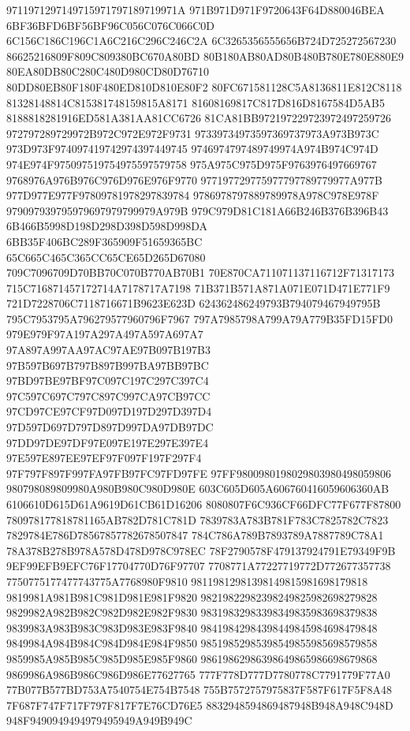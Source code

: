 9711971297149715971797189719971A
971B971D971F9720643F64D880046BEA
6BF36BFD6BF56BF96C056C076C066C0D
6C156C186C196C1A6C216C296C246C2A
6C3265356555656B724D725272567230
86625216809F809C809380BC670A80BD
80B180AB80AD80B480B780E780E880E9
80EA80DB80C280C480D980CD80D76710
80DD80EB80F180F480ED810D810E80F2
80FC671581128C5A8136811E812C8118
81328148814C815381748159815A8171
81608169817C817D816D8167584D5AB5
8188818281916ED581A381AA81CC6726
81CA81BB972197229723972497259726
972797289729972B972C972E972F9731
97339734973597369737973A973B973C
973D973F974097419742974397449745
9746974797489749974A974B974C974D
974E974F975097519754975597579758
975A975C975D975F9763976497669767
9768976A976B976C976D976E976F9770
977197729775977797789779977A977B
977D977E977F97809781978297839784
9786978797889789978A978C978E978F
979097939795979697979799979A979B
979C979D81C181A66B246B376B396B43
6B466B5998D198D298D398D598D998DA
6BB35F406BC289F365909F51659365BC
65C665C465C365CC65CE65D265D67080
709C7096709D70BB70C070B770AB70B1
70E870CA711071137116712F71317173
715C716871457172714A7178717A7198
71B371B571A871A071E071D471E771F9
721D7228706C7118716671B9623E623D
624362486249793B794079467949795B
795C7953795A796279577960796F7967
797A7985798A799A79A779B35FD15FD0
979E979F97A197A297A497A597A697A7
97A897A997AA97AC97AE97B097B197B3
97B597B697B797B897B997BA97BB97BC
97BD97BE97BF97C097C197C297C397C4
97C597C697C797C897C997CA97CB97CC
97CD97CE97CF97D097D197D297D397D4
97D597D697D797D897D997DA97DB97DC
97DD97DE97DF97E097E197E297E397E4
97E597E897EE97EF97F097F197F297F4
97F797F897F997FA97FB97FC97FD97FE
97FF9800980198029803980498059806
980798089809980A980B980C980D980E
603C605D605A606760416059606360AB
6106610D615D61A9619D61CB61D16206
8080807F6C936CF66DFC77F677F87800
780978177818781165AB782D781C781D
7839783A783B781F783C7825782C7823
7829784E786D78567857782678507847
784C786A789B7893789A7887789C78A1
78A378B278B978A578D478D978C978EC
78F2790578F479137924791E79349F9B
9EF99EFB9EFC76F17704770D76F97707
7708771A77227719772D772677357738
7750775177477743775A7768980F9810
98119812981398149815981698179818
9819981A981B981C981D981E981F9820
98219822982398249825982698279828
9829982A982B982C982D982E982F9830
98319832983398349835983698379838
9839983A983B983C983D983E983F9840
98419842984398449845984698479848
9849984A984B984C984D984E984F9850
98519852985398549855985698579858
9859985A985B985C985D985E985F9860
98619862986398649865986698679868
9869986A986B986C986D986E77627765
777F778D777D7780778C7791779F77A0
77B077B577BD753A7540754E754B7548
755B7572757975837F587F617F5F8A48
7F687F747F717F797F817F7E76CD76E5
8832948594869487948B948A948C948D
948F9490949494979495949A949B949C
